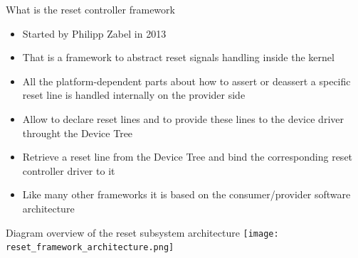 \documentclass{beamer}
\begin{document}
\begin{frame}{What is the reset controller framework}
	\begin{itemize}
		\item Started by Philipp Zabel in 2013
		\item That is a framework to abstract reset signals handling inside the kernel
		\item All the platform-dependent parts about how to assert or deassert a specific reset line is handled internally on the provider side
		\item Allow to declare reset lines and to provide these lines to the device driver throught the Device Tree
		\item Retrieve a reset line from the Device Tree and bind the corresponding reset controller driver to it
		\item Like many other frameworks it is based on the consumer/provider software architecture
	\end{itemize}
\end{frame}

\begin{frame}{Diagram overview of the reset subsystem architecture}
	\centering
	\texttt{[image: reset\_framework\_architecture.png]}
\end{frame}
\end{document}
